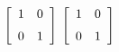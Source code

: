 {$\left[ \begin {array}{cc} 1&0\\\noalign{\medskip}0&1\end {array}
 \right] $
 }
{$\left[ \begin {array}{cc} 1&0\\\noalign{\medskip}0&1\end {array}
 \right] $}
